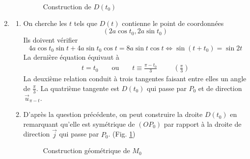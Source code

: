 \begin{enumerate}
\begin{enumerate}
\begin{figure}[ht]
  \centering
  
  \caption{Construction de $D(t_0)$}
  \label{fig:Castro_3}
\end{figure}
\end{enumerate}

\item
\begin{enumerate}
 \item   On cherche les $t$ tels que $D(t)$ contienne le point de coordonn{\'e}es 
\begin{displaymath}
(2a\cos t_{0},2a\sin t_{0}) 
\end{displaymath}
Ils doivent vérifier
\begin{displaymath}
4a\cos t_{0}\sin t+4a\sin t_{0}\cos t = 8a\sin t\cos t \Leftrightarrow
\sin (t+t_{0}) = \sin 2t
\end{displaymath}
La derni{\`e}re {\'e}quation {\'e}quivaut {\`a} 
\begin{align*}
 t=t_{0} &  &\text{ ou }& & t\equiv \frac{\pi -t_{0}}{3} \hspace{1cm}(\frac{\pi }{3})
\end{align*}
La deuxième relation conduit à trois tangentes faisant entre elles un angle de $\frac{\pi }{3}$.\newline
La quatrième tangente est $D(t_{0})$ qui passe par $P_{0}$ et de direction $\,\overrightarrow{u}_{\pi -t}$.

\item  D'après la question précédente, on peut construire la droite $D(t_{0})$ en remarquant qu'elle est sym{\'e}trique de $(OP_{0})$ par rapport {\`a} la droite de direction $\overrightarrow{j}$ qui passe par $P_{0}$. (Fig. \ref{fig:Castro_3})

\begin{figure}[ht]
	\centering
	
	\caption{Construction géométrique de $M_0$}
\label{fig:Castro_4}
\end{figure}


\end{enumerate}
\end{enumerate}
